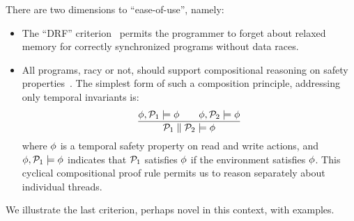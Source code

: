 There are two dimensions to ``ease-of-use'', namely:
\begin{itemize}
\item The ``DRF'' criterion~\cite{DBLP:journals/tpds/AdveH93, DBLP:conf/isca/AdveH90} permits the programmer to forget about relaxed memory for correctly synchronized programs without data races.  

\item All programs, racy or not,  should support compositional reasoning on safety properties~\cite{PnueliSafety,Misra:1981:PNP:1313338.1313770,StarkSafety,Abadi:1993:CS:151646.151649}.  The simplest form of such a composition principle, addressing only temporal invariants is:
\[
  \frac{
      \phi, \mathcal{P}_1 \models\phi
      \qquad
      \phi, \mathcal{P}_2 \models\phi
    }{\mathcal{P}_1 \parallel \mathcal{P}_2 \models \phi}
\]
where $\phi$ is a temporal safety property on read and write actions, and $\phi, \mathcal{P}_1 \models\phi$ indicates that $\mathcal{P}_1$ satisfies $\phi$ if the environment satisfies $\phi$.  This cyclical compositional proof rule permits us to reason separately about individual threads. 
\end{itemize}
We illustrate the last criterion, perhaps novel in this context, with examples.   
